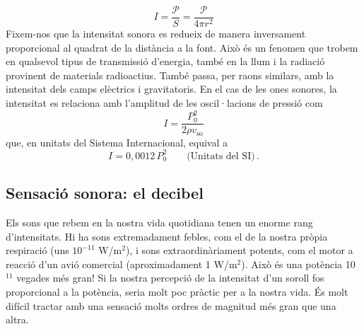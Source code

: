 \documentclass[12pt]{book}
\begin{document}
%
\begin{equation}
    \boxed{I = \frac{\mathcal{P}}{S} = \frac{\mathcal{P}}{4 \pi r^2}}
\end{equation}
%
Fixem-nos que la intensitat sonora es redueix de manera inversament proporcional al quadrat de la distància a la font. Això és un fenomen que trobem en qualsevol tipus de transmissió d'energia, també en la llum i la radiació provinent de materials radioactius. També passa, per raons similars, amb la intensitat dels camps elèctrics i gravitatoris. En el cas de les ones sonores, la intensitat es relaciona amb l'amplitud de les oscil·lacions de pressió com
%
\begin{equation}
    \boxed{I = \frac{P_0^2}{2\rho v_\text{so}}}
\end{equation}
%
que, en unitats del Sistema Internacional, equival a
%
\begin{equation}
    I = 0,0012 \, P_0^2 \qquad \text{(Unitats del SI)}\, .
\end{equation}
%

\subsection{Sensació sonora: el decibel}

Els sons que rebem en la nostra vida quotidiana tenen un enorme rang d'intensitats. Hi ha sons extremadament febles, com el de la nostra pròpia respiració (uns $10^{-11}$ W/m$^2$), i sons extraordinàriament potents, com el motor a reacció d'un avió comercial (aproximadament 1 W/m$^2$). Això és una potència 10$^{11}$ vegades més gran! Si la nostra percepció de la intensitat d'un soroll fos proporcional a la potència, seria molt poc pràctic per a la nostra vida. És molt difícil tractar amb una sensació molts ordres de magnitud més gran que una altra. 
\end{document}
